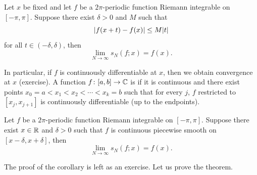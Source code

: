 \begin{thm} \label{thm:fourierlocalization}
Let $x$ be fixed and let $f$ be a $2\pi$-periodic function
Riemann integrable on $[-\pi,\pi]$.  Suppose
there exist $\delta > 0$ and $M$ such that
\begin{equation*}
\lvert {f(x+t)-f(x)} \rvert \leq M \lvert {t} \rvert
\end{equation*}
for all $t \in (-\delta,\delta)$, then
\begin{equation*}
\lim_{N \to \infty} s_N(f;x) = f(x) .
\end{equation*}
\end{thm}

In particular,
if $f$ is continuously
differentiable at $x$,
then we obtain convergence at $x$ (exercise).
A function $f \colon [a,b] \to {\mathbb{C}}$ is
\emph{}
if it is continuous and there exist points
$x_0 = a < x_1 < x_2 < \cdots < x_k = b$
such that for every $j$, $f$ restricted to $[x_j,x_{j+1}]$
is continuously differentiable (up to the endpoints).

\begin{cor} \label{cor:fourierpiecewisesmooth}
Let $f$ be a $2\pi$-periodic function
Riemann integrable on $[-\pi,\pi]$.  Suppose
there exist $x\in {\mathbb{R}}$ and $\delta > 0$ such that $f$ is continuous piecewise
smooth on $[x-\delta,x+\delta]$, then
\begin{equation*}
\lim_{N \to \infty} s_N(f;x) = f(x) .
\end{equation*}
\end{cor}

The proof of the corollary is left as an exercise.  Let us prove the
theorem.

